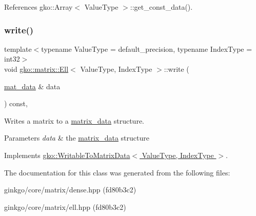 References gko\+::\+Array$<$ Value\+Type $>$\+::get\+\_\+const\+\_\+data().

\mbox{\label{classgko_1_1matrix_1_1Ell_afa9148a16a9255003055d8e9156ee941}} 
\subsubsection{\texorpdfstring{write()}{write()}}
{\footnotesize\ttfamily template$<$typename Value\+Type = default\+\_\+precision, typename Index\+Type = int32$>$ \\
void \hyperlink{classgko_1_1matrix_1_1Ell}{gko\+::matrix\+::\+Ell}$<$ Value\+Type, Index\+Type $>$\+::write (\begin{DoxyParamCaption}\item[{\hyperlink{structgko_1_1matrix__data}{mat\+\_\+data} \&}]{data }\end{DoxyParamCaption}) const\hspace{0.3cm}{\ttfamily [override]}, {\ttfamily [virtual]}}



Writes a matrix to a \hyperlink{structgko_1_1matrix__data}{matrix\+\_\+data} structure. 


\begin{DoxyParams}{Parameters}
{\em data} & the \hyperlink{structgko_1_1matrix__data}{matrix\+\_\+data} structure \\
\hline
\end{DoxyParams}


Implements \hyperlink{classgko_1_1WritableToMatrixData_a96036c3a4bf4c67fa93002808b8b14e2}{gko\+::\+Writable\+To\+Matrix\+Data$<$ Value\+Type, Index\+Type $>$}.



The documentation for this class was generated from the following files\+:\begin{DoxyCompactItemize}
\item 
ginkgo/core/matrix/dense.\+hpp (fd80b3c2)\item 
ginkgo/core/matrix/ell.\+hpp (fd80b3c2)\end{DoxyCompactItemize}
